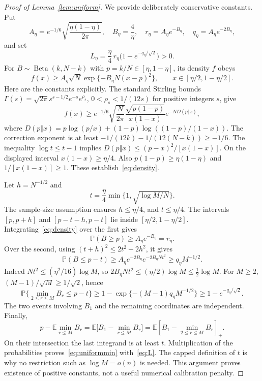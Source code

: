 \documentclass[10pt]{article}
\theoremstyle{definition}\newtheorem{definition}[theorem]{Definition}
\theoremstyle{remark}\newtheorem{remark}[theorem]{Remark}
\newcommand{\E}{\mathbb E}
\newcommand{\Prob}{\mathbb P}
\newcommand{\1}{\mathbf 1}
\newcommand{\Beta}{\operatorname{Beta}}
\newcommand{\pos}[1]{\left[#1\right]_+}
\begin{document}
\begin{proof}[Proof of Lemma~\ref{lem:uniform}]
We provide deliberately conservative constants. Put
\begin{equation}\label{eq:constants}
 A_\eta=e^{-1/6}\sqrt{\frac{\eta(1-\eta)}{2\pi}},\quad
 B_\eta=\frac4\eta,\quad
 r_\eta=A_\eta e^{-B_\eta},\quad q_\eta=A_\eta e^{-2B_\eta},
\end{equation}
and set
\begin{equation}\label{eq:L}
 L_\eta=\frac\eta4\,r_\eta\bigl(1-e^{-q_\eta/\sqrt2}\bigr)>0.
\end{equation}
For $B\sim\Beta(k,N-k)$ with $p=k/N\in[\eta,1-\eta]$, its density $f$ obeys
\begin{equation}\label{eq:density}
 f(x)\ge A_\eta\sqrt N\exp\{-B_\eta N(x-p)^2\},
 \qquad x\in[\eta/2,1-\eta/2].
\end{equation}
Here are the constants explicitly. The standard Stirling bounds
$\Gamma(s)=\sqrt{2\pi}s^{s-1/2}e^{-s}e^{\rho_s}$, $0<\rho_s<1/(12s)$ for positive integers $s$, give
\[
 f(x)\ge e^{-1/6}\sqrt{\frac N{2\pi}}
 \frac{\sqrt{p(1-p)}}{x(1-x)}e^{-ND(p\Vert x)},
\]
where $D(p\Vert x)=p\log(p/x)+(1-p)\log((1-p)/(1-x))$. The correction exponent is at least $-1/(12k)-1/(12(N-k))\ge-1/6$. The inequality $\log t\le t-1$ implies
$D(p\Vert x)\le(p-x)^2/[x(1-x)]$. On the displayed interval $x(1-x)\ge\eta/4$. Also $p(1-p)\ge\eta(1-\eta)$ and $1/[x(1-x)]\ge1$. These establish~\eqref{eq:density}.

Let $h=N^{-1/2}$ and
\[
 t=\frac\eta4\min\{1,\sqrt{\log M/N}\}.
\]
The sample-size assumption ensures $h\le\eta/4$, and $t\le\eta/4$. The intervals $[p,p+h]$ and $[p-t-h,p-t]$ lie inside $[\eta/2,1-\eta/2]$. Integrating~\eqref{eq:density} over the first gives
\[
 \Prob(B\ge p)\ge A_\eta e^{-B_\eta}=r_\eta.
\]
Over the second, using $(t+h)^2\le2t^2+2h^2$, it gives
\[
 \Prob(B\le p-t)\ge A_\eta e^{-2B_\eta}e^{-2B_\eta Nt^2}
 \ge q_\eta M^{-1/2}.
\]
Indeed $Nt^2\le(\eta^2/16)\log M$, so $2B_\eta Nt^2\le(\eta/2)\log M\le\tfrac12\log M$. For $M\ge2$, $(M-1)/\sqrt M\ge1/\sqrt2$, hence
\[
 \Prob\{\min_{2\le r\le M}B_r\le p-t\}
 \ge1-\exp\{-(M-1)q_\eta M^{-1/2}\}
 \ge1-e^{-q_\eta/\sqrt2}.
\]
The two events involving $B_1$ and the remaining coordinates are independent. Finally,
\[
 p-\E\min_{r\le M}B_r
 =\E\bigl[B_1-\min_{r\le M}B_r\bigr]
 =\E\pos{B_1-\min_{2\le r\le M}B_r}.
\]
On their intersection the last integrand is at least $t$. Multiplication of the probabilities proves~\eqref{eq:uniformmin} with~\eqref{eq:L}. The capped definition of $t$ is why no restriction such as $\log M=o(n)$ is needed. This argument proves existence of positive constants, not a useful numerical calibration penalty.
\end{proof}
\end{document}
